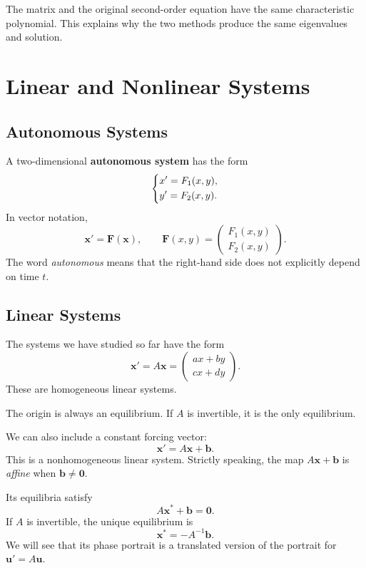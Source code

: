 \documentclass[10pt,letterpaper]{article}
\begin{document}
The matrix and the original second-order equation
have the same characteristic polynomial. This explains
why the two methods produce the same eigenvalues
and solution.

\section{Linear and Nonlinear Systems}

\subsection{Autonomous Systems}

A two-dimensional \textbf{autonomous system} has the form
\[
\begin{dcases}
x'=F_1(x,y),\\
y'=F_2(x,y).
\end{dcases}
\]
In vector notation,
\[
\boxed{
\mathbf{x}'=\mathbf{F}(\mathbf{x}),
\qquad
\mathbf{F}(x,y)=
\begin{pmatrix}
F_1(x,y)\\
F_2(x,y)
\end{pmatrix}.
}
\]
The word \textit{autonomous} means that the right-hand
side does not explicitly depend on time $t$.

\subsection{Linear Systems}

The systems we have studied so far have the form
\[
\mathbf{x}'=A\mathbf{x}
=
\begin{pmatrix}
ax+by\\
cx+dy
\end{pmatrix}.
\]
These are homogeneous linear systems.

The origin is always an equilibrium. If $A$ is
invertible, it is the only equilibrium.

We can also include a constant forcing vector:
\[
\mathbf{x}'=A\mathbf{x}+\mathbf{b}.
\]
This is a nonhomogeneous linear system. Strictly speaking,
the map $A\mathbf{x}+\mathbf{b}$ is \textit{affine}
when $\mathbf{b}\ne\mathbf{0}$.

Its equilibria satisfy
\[
A\mathbf{x}^*+\mathbf{b}=\mathbf{0}.
\]
If $A$ is invertible, the unique equilibrium is
\[
\boxed{\mathbf{x}^*=-A^{-1}\mathbf{b}.}
\]
We will see that its phase portrait is a translated
version of the portrait for $\mathbf{u}'=A\mathbf{u}$.
\end{document}
